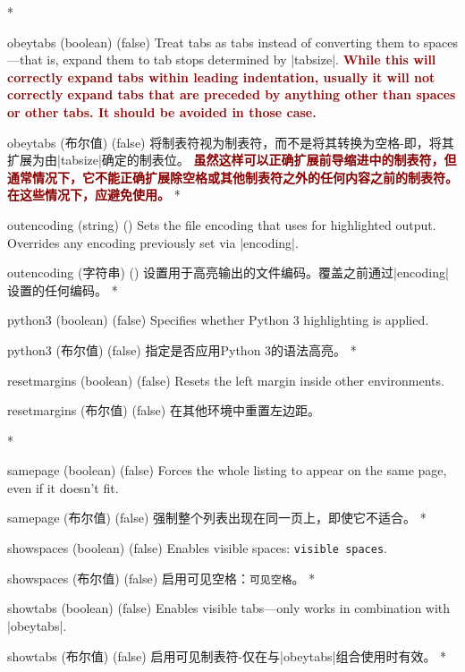 \begin{optionlist}
\begin{paracol}{2}
\switchcolumn[0]*%
  \item[obeytabs (boolean) (false)]
    Treat tabs as tabs instead of converting them to spaces---that is, expand them to tab stops determined by |tabsize|.  \textcolor{DarkRed}{\textbf{While this will correctly expand tabs within leading indentation, usually it will not correctly expand tabs that are preceded by anything other than spaces or other tabs.  It should be avoided in those case.}}
    \switchcolumn
    \item[obeytabs (布尔值) (false)]
    将制表符视为制表符，而不是将其转换为空格-即，将其扩展为由|tabsize|确定的制表位。 \textcolor{DarkRed}{\textbf{虽然这样可以正确扩展前导缩进中的制表符，但通常情况下，它不能正确扩展除空格或其他制表符之外的任何内容之前的制表符。在这些情况下，应避免使用。}}
    \switchcolumn[0]*%
  \item[outencoding (string) (\meta{system-specific})]
    Sets the file encoding that  uses for highlighted output.  Overrides any encoding previously set via |encoding|.
    \switchcolumn
    \item[outencoding (字符串) (\meta{系统特定})]
    设置用于高亮输出的文件编码。覆盖之前通过|encoding|设置的任何编码。
\switchcolumn[0]*%
  \item[python3 (boolean) (false)] 
    Specifies whether Python 3 highlighting is applied.
    \switchcolumn
    \item[python3 (布尔值) (false)] 
    指定是否应用Python 3的语法高亮。
\switchcolumn[0]*%
  \item[resetmargins (boolean) (false)]
    Resets the left margin inside other environments.
    \switchcolumn
    \item[resetmargins (布尔值) (false)]
    在其他环境中重置左边距。

\switchcolumn[0]*%
  \item[samepage (boolean) (false)]
    Forces the whole listing to appear on the same page, even if it doesn't fit.
    \switchcolumn
    \item[samepage (布尔值) (false)]
    强制整个列表出现在同一页上，即使它不适合。
\switchcolumn[0]*%
  \item[showspaces (boolean) (false)]
    Enables visible spaces: \verb*/visible spaces/.
    \switchcolumn
    \item[showspaces (布尔值) (false)]
    启用可见空格：\verb*/可见空格/。
\switchcolumn[0]*%
  \item[showtabs (boolean) (false)]
    Enables visible tabs---only works in combination with |obeytabs|.
    \switchcolumn
    \item[showtabs (布尔值) (false)]
    启用可见制表符-仅在与|obeytabs|组合使用时有效。
    \switchcolumn[0]*%


\end{paracol}
\end{optionlist}
